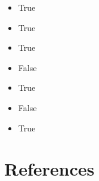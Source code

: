 \documentclass[
  nswissgerman,
  a4paper,
  DIV=11,
  numbers=noendperiod,
  oneside,
  openany]{scrreprt}
\providecommand{\tightlist}{%
  \setlength{\itemsep}{0pt}\setlength{\parskip}{0pt}}
\begin{document}
\begin{itemize}
\tightlist
\item
  True
\item
  True
\item
  True
\item
  False
\item
  True
\item
  False
\item
  True
\end{itemize}


\chapter*{References}\label{references}

\end{document}
